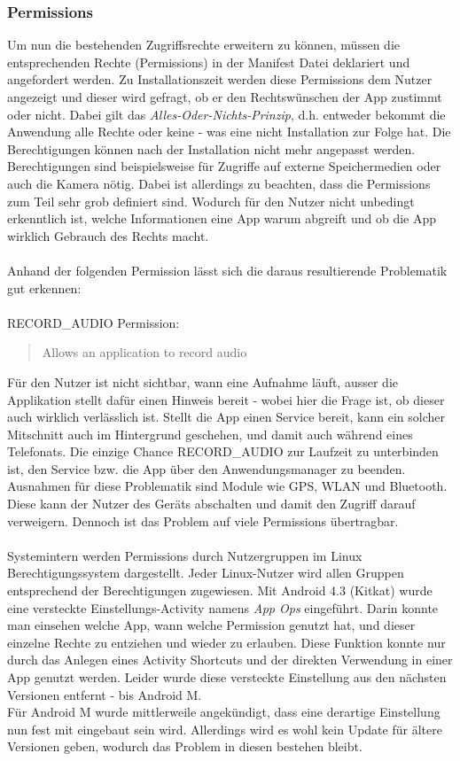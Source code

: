 	\subsubsection{Permissions}
	Um nun die bestehenden Zugriffsrechte erweitern zu können, müssen die entsprechenden Rechte (Permissions) in der Manifest Datei deklariert und angefordert werden. Zu Installationszeit werden diese Permissions dem Nutzer angezeigt und dieser wird gefragt, ob er den Rechtswünschen der App zustimmt oder nicht. Dabei gilt das \textit{Alles-Oder-Nichts-Prinzip}, d.h. entweder bekommt die Anwendung alle Rechte oder keine - was eine nicht Installation zur Folge hat. Die Berechtigungen können nach der Installation nicht mehr angepasst werden. Berechtigungen sind beispielsweise für Zugriffe auf externe Speichermedien oder auch die Kamera nötig. Dabei ist allerdings zu beachten, dass die Permissions zum Teil sehr grob definiert sind. Wodurch für den Nutzer nicht unbedingt erkenntlich ist, welche Informationen eine App warum abgreift und ob die App wirklich Gebrauch des Rechts macht.\\\\
	Anhand der folgenden Permission lässt sich die daraus resultierende Problematik gut erkennen:\\\\
	RECORD\_AUDIO Permission:
	\begin{quote}
	Allows an application to record audio \cite{RECORD_AUDIO}
	\end{quote} 
	Für den Nutzer ist nicht sichtbar, wann eine Aufnahme läuft, ausser die Applikation stellt dafür einen Hinweis bereit - wobei hier die Frage ist, ob dieser auch wirklich verlässlich ist. Stellt die App einen Service bereit, kann ein solcher Mitschnitt auch im Hintergrund geschehen, und damit auch während eines Telefonats. Die einzige Chance RECORD\_AUDIO zur Laufzeit zu unterbinden ist, den Service bzw. die App über den Anwendungsmanager zu beenden.	Ausnahmen für diese Problematik sind Module wie GPS, WLAN und Bluetooth. Diese kann der Nutzer des Geräts abschalten und damit den Zugriff darauf verweigern.
	Dennoch ist das Problem auf viele Permissions übertragbar.\\\\
	Systemintern werden Permissions durch Nutzergruppen im Linux Berechtigungssystem dargestellt\cite[S. 28]{Drake2014}. Jeder Linux-Nutzer wird allen Gruppen entsprechend der Berechtigungen zugewiesen.
	Mit Android 4.3 (Kitkat) wurde eine versteckte Einstellungs-Activity namens \textit{App Ops} eingeführt. Darin konnte man einsehen welche App, wann welche Permission genutzt hat, und dieser einzelne Rechte zu entziehen und wieder zu erlauben. Diese Funktion konnte nur durch das Anlegen eines Activity Shortcuts und der direkten Verwendung in einer App genutzt werden. Leider wurde diese versteckte Einstellung aus den nächsten Versionen entfernt - bis Android M. \cite{HiddenActivity} \\
	Für Android M wurde mittlerweile angekündigt, dass eine derartige Einstellung nun fest mit eingebaut sein wird.\cite{AndroidMPermission} Allerdings wird es wohl kein Update für ältere Versionen geben, wodurch das Problem in diesen bestehen bleibt.
	
